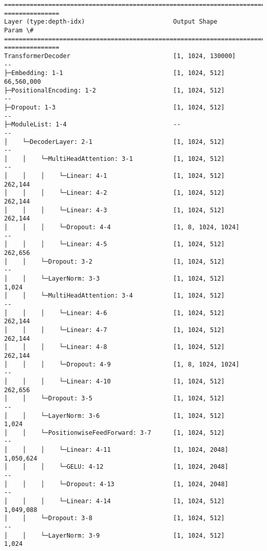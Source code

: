 \documentclass[12pt]{article}
\begin{document}
    \begin{Verbatim}[commandchars=\\\{\}]
================================================================================
===============
Layer (type:depth-idx)                        Output Shape              Param \#
================================================================================
===============
TransformerDecoder                            [1, 1024, 130000]         --
├─Embedding: 1-1                              [1, 1024, 512]
66,560,000
├─PositionalEncoding: 1-2                     [1, 1024, 512]            --
├─Dropout: 1-3                                [1, 1024, 512]            --
├─ModuleList: 1-4                             --                        --
│    └─DecoderLayer: 2-1                      [1, 1024, 512]            --
│    │    └─MultiHeadAttention: 3-1           [1, 1024, 512]            --
│    │    │    └─Linear: 4-1                  [1, 1024, 512]            262,144
│    │    │    └─Linear: 4-2                  [1, 1024, 512]            262,144
│    │    │    └─Linear: 4-3                  [1, 1024, 512]            262,144
│    │    │    └─Dropout: 4-4                 [1, 8, 1024, 1024]        --
│    │    │    └─Linear: 4-5                  [1, 1024, 512]            262,656
│    │    └─Dropout: 3-2                      [1, 1024, 512]            --
│    │    └─LayerNorm: 3-3                    [1, 1024, 512]            1,024
│    │    └─MultiHeadAttention: 3-4           [1, 1024, 512]            --
│    │    │    └─Linear: 4-6                  [1, 1024, 512]            262,144
│    │    │    └─Linear: 4-7                  [1, 1024, 512]            262,144
│    │    │    └─Linear: 4-8                  [1, 1024, 512]            262,144
│    │    │    └─Dropout: 4-9                 [1, 8, 1024, 1024]        --
│    │    │    └─Linear: 4-10                 [1, 1024, 512]            262,656
│    │    └─Dropout: 3-5                      [1, 1024, 512]            --
│    │    └─LayerNorm: 3-6                    [1, 1024, 512]            1,024
│    │    └─PositionwiseFeedForward: 3-7      [1, 1024, 512]            --
│    │    │    └─Linear: 4-11                 [1, 1024, 2048]
1,050,624
│    │    │    └─GELU: 4-12                   [1, 1024, 2048]           --
│    │    │    └─Dropout: 4-13                [1, 1024, 2048]           --
│    │    │    └─Linear: 4-14                 [1, 1024, 512]
1,049,088
│    │    └─Dropout: 3-8                      [1, 1024, 512]            --
│    │    └─LayerNorm: 3-9                    [1, 1024, 512]            1,024

\end{Verbatim}
\end{document}
